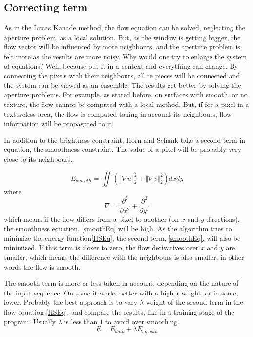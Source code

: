 \documentclass[12pt,a4paper,twoside]{report}
\begin{document}
\subsection{Correcting term}
As in the Lucas Kanade method, the flow equation can be solved, neglecting the aperture problem, as a local solution. But, as the window is getting bigger, the flow vector will be influenced by more neighbours, and the aperture problem is felt more as the results are more noisy. Why would one try to enlarge the system of equations? Well, because put it in a context and everything can change. By connecting the pixels with their neighbours, all te pieces will be connected and the system can be viewed as an ensemble. The results get better by solving the aperture problems. For example, as stated before, on surfaces with smooth, or no texture, the flow cannot be computed with a local method. But, if for a pixel in a textureless area, the flow is computed taking in account its neighbours, flow information will be propagated to it.

In addition to the brightness constraint, Horn and Schunk take a second term in equation, the smoothness constraint. The value of a pixel will be probably very close to its neighbours.

\begin{equation} \label{smoothEq}
	E_{smooth} = \iint (\left\Vert\nabla u \right\Vert_2^2 +\left\Vert\nabla v \right\Vert_2^2)dxdy
\end{equation}
where
\begin{equation} \label{mynabla}
	\nabla = \frac{\partial^2}{\partial x^2} + \frac{\partial^2}{\partial y^2}
\end{equation}
which means if the flow differs from a pixel to another (on $x$ and $y$ directions), the smoothness equation, \ref{smoothEq} will be high. As the algorithm tries to minimize the energy function\ref{HSEq}, the second term, \ref{smoothEq}, will also be minimized. If this term is closer to zero, the flow derivatives over $x$ and $y$  are smaller, which means the difference with the  neighbours is also smaller, in other words the flow is smooth.

The smooth term is more or less taken in account, depending on the nature of the input sequence. On some it works better with a higher weight, or in some, lower. Probably the best approach is to vary $\lambda$ weight of the second term in the flow equation \ref{HSEq}, and compare the results, like in a training stage of the program. Usually $\lambda$ is less than $1$ to avoid over smoothing.
\begin{equation}
	E = E_{data}+\lambda E_{smooth}
\end{equation}
\end{document}
